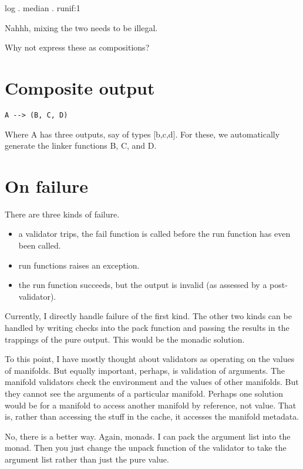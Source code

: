 \documentclass[12pt]{article}
\begin{document}
log . median . runif:1


Nahhh, mixing the two needs to be illegal.

Why not express these as compositions?


\section{Composite output}

\begin{verbatim}
A --> (B, C, D)
\end{verbatim}

Where A has three outputs, say of types [b,c,d]. For these, we automatically
generate the linker functions B, C, and D.

\section{On failure}

There are three kinds of failure.

\begin{itemize}
  \item a validator trips, the fail function is called before the run function has
     even been called.
  \item run functions raises an exception.
  \item the run function succeeds, but the output is invalid (as assessed by
     a post-validator).
\end{itemize}

Currently, I directly handle failure of the first kind. The other two kinds can
be handled by writing checks into the pack function and passing the results in
the trappings of the pure output. This would be the monadic solution.

To this point, I have mostly thought about validators as operating on the
values of manifolds. But equally important, perhaps, is validation of
arguments. The manifold validators check the environment and the values of
other manifolds. But they cannot see the arguments of a particular manifold.
Perhaps one solution would be for a manifold to access another manifold by
reference, not value. That is, rather than accessing the stuff in the cache, it
accesses the manifold metadata.

No, there is a better way. Again, monads. I can pack the argument list into the
monad. Then you just change the unpack function of the validator to take the
argument list rather than just the pure value.
\end{document}

